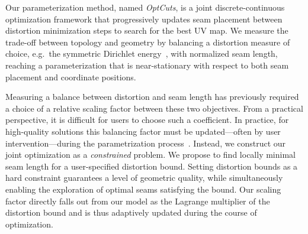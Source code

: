Our parameterization method, named {\em OptCuts}, %
is a joint discrete-continuous optimization framework that progressively updates seam placement between distortion minimization steps to search for the best UV map. 
%
We measure the trade-off between topology and geometry by balancing a distortion measure of choice, e.g.\ the symmetric Dirichlet energy~\cite{Smith2015Bijective}, with normalized seam length, reaching a parameterization that is near-stationary with respect to both seam placement and coordinate positions. %

Measuring a balance between distortion and seam length has previously required a choice of a relative scaling factor between these two objectives.  From a practical perspective, it is difficult for users to choose such a coefficient. %
In practice, for high-quality solutions this balancing factor must be %
updated---often by user intervention---during the parametrization process\ \cite{Poranne2017Autocuts}. Instead, we construct our joint optimization as a \emph{constrained} problem. We propose to find locally minimal seam length for a user-specified distortion bound. Setting distortion bounds as a hard constraint guarantees a level of geometric quality, while simultaneously enabling the exploration of optimal seams satisfying the bound. %
Our scaling factor directly falls out from our model as the Lagrange multiplier of the distortion bound and is thus adaptively updated during the course of optimization.  %

